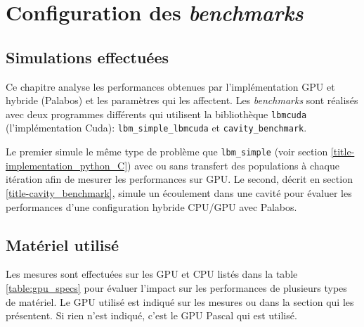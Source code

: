 \section{Configuration des \textit{benchmarks}}
\subsection{Simulations effectuées}
Ce chapitre analyse les performances obtenues par l'implémentation \acs{GPU} et hybride (Palabos) et les paramètres qui les affectent. Les \textit{benchmarks} sont réalisés avec deux programmes différents qui utilisent la bibliothèque \texttt{lbmcuda} (l'implémentation Cuda): \texttt{lbm\_simple\_lbmcuda} et \texttt{cavity\_benchmark}.

Le premier simule le même type de problème que \texttt{lbm\_simple} (voir section \ref{title-implementation_python_C}) avec ou sans transfert des populations à chaque itération afin de mesurer les performances sur \acs{GPU}. Le second, décrit en section \ref{title-cavity_benchmark}, simule un écoulement dans une cavité pour évaluer les performances d'une configuration hybride \acs{CPU}/\acs{GPU} avec Palabos.  

\subsection{Matériel utilisé}
Les mesures sont effectuées sur les \acs{GPU} et \acs{CPU} listés dans la table \ref{table:gpu_specs} pour évaluer l'impact sur les performances de plusieurs types de matériel. Le \acs{GPU} utilisé est indiqué sur les mesures ou dans la section qui les présentent. Si rien n'est indiqué, c'est le \acs{GPU} Pascal qui est utilisé.


